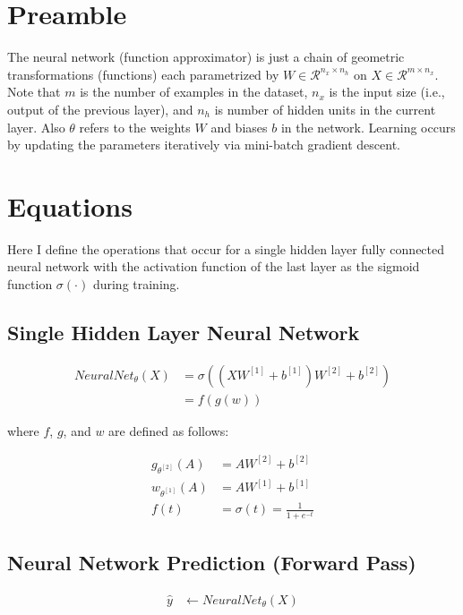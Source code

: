 \documentclass{article}
\begin{document}
\section{Preamble}
The neural network
(function approximator) is just a chain of geometric transformations (functions)
each parametrized by $W \in \mathcal{R}^{n_x \times n_h}$
on $X \in \mathcal{R}^{m \times n_x}$.
Note that $m$ is the number of examples
in the dataset, $n_x$ is the input size (i.e., output of the previous layer),
and $n_h$ is number of hidden units in the current layer. Also $\theta$ refers
to the weights $W$ and biases ${b}$ in the network. Learning occurs by updating
the parameters iteratively via mini-batch gradient descent.

\section{Equations}
Here I define the operations that occur for a single hidden layer fully
connected neural network with the activation function of the last
layer as the sigmoid function $\sigma(\cdot)$ during training.

\subsection{Single Hidden Layer Neural Network}
\begin{equation}
	\begin{aligned}
		NeuralNet_{\theta}(X) & =
		\sigma((XW^{[1]}
		+ {b}^{[1]})W^{[2]} + {b}^{[2]})  \\
		                      & = f(g(w))
	\end{aligned}
\end{equation}

where $f$, $g$, and $w$ are defined as follows:

\begin{equation}
	\begin{aligned}
		g_{\theta^{[2]}}(A) & = AW^{[2]} + {b}^{[2]}             \\
		w_{\theta^{[1]}}(A) & = AW^{[1]} + {b}^{[1]}             \\
		f(t)                & = \sigma(t) = \frac{1}{1 + e^{-t}}
	\end{aligned}
\end{equation}

\subsection{Neural Network Prediction (Forward Pass)}
\begin{align}
	\hat{y} & \gets NeuralNet_\theta(X)
\end{align}
\end{document}
